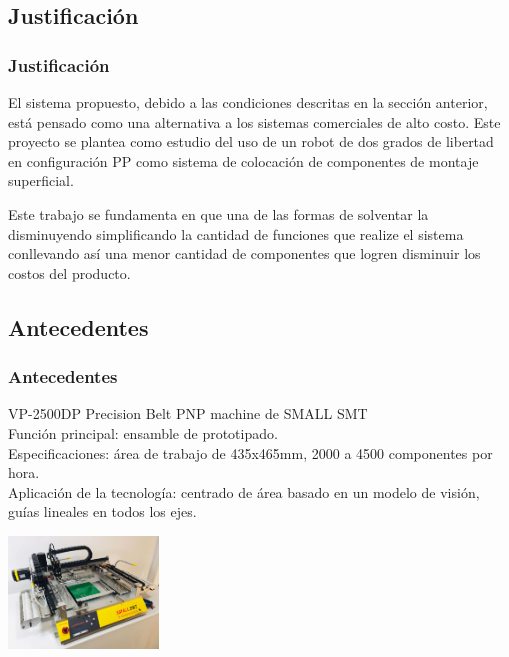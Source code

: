 	\begin{frame}
		\section{Justificación}
		\frametitle{Justificación}
		El sistema propuesto, debido a las condiciones descritas en la sección anterior, está pensado como una alternativa a los sistemas comerciales de alto costo. Este proyecto se plantea como estudio del uso de un robot de dos grados de libertad en configuración PP como sistema de colocación de componentes de montaje superficial.
		
		Este trabajo se fundamenta en que una de las formas de solventar la disminuyendo simplificando la cantidad de funciones que realize el sistema conllevando así una menor cantidad de componentes que logren disminuir los costos del producto.
	\end{frame}
	\begin{frame}
		\section{Antecedentes}
		\frametitle{Antecedentes}
			VP-2500DP Precision Belt PNP machine de SMALL SMT \\
			Funci\'on principal: ensamble de prototipado.\\
			Especificaciones: \'area de trabajo de 435x465mm, 2000 a 4500 componentes por hora.\\
			Aplicaci\'on de la tecnolog\'ia: centrado de \'area basado en un modelo de visi\'on, gu\'ias lineales en todos los  ejes.\\
			\begin{center}
				\includegraphics[height=30mm]{images/r1}
			\end{center}
	\end{frame}
